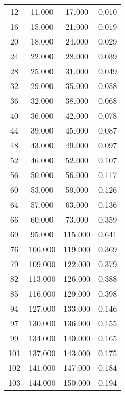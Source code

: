 % 
\begin{tabular}{cccc}
  \hline
  \hline
12 & 11.000 & 17.000 & 0.010 \\ 
  16 & 15.000 & 21.000 & 0.019 \\ 
  20 & 18.000 & 24.000 & 0.029 \\ 
  24 & 22.000 & 28.000 & 0.039 \\ 
  28 & 25.000 & 31.000 & 0.049 \\ 
  32 & 29.000 & 35.000 & 0.058 \\ 
  36 & 32.000 & 38.000 & 0.068 \\ 
  40 & 36.000 & 42.000 & 0.078 \\ 
  44 & 39.000 & 45.000 & 0.087 \\ 
  48 & 43.000 & 49.000 & 0.097 \\ 
  52 & 46.000 & 52.000 & 0.107 \\ 
  56 & 50.000 & 56.000 & 0.117 \\ 
  60 & 53.000 & 59.000 & 0.126 \\ 
  64 & 57.000 & 63.000 & 0.136 \\ 
  66 & 60.000 & 73.000 & 0.359 \\ 
  69 & 95.000 & 115.000 & 0.641 \\ 
  76 & 106.000 & 119.000 & 0.369 \\ 
  79 & 109.000 & 122.000 & 0.379 \\ 
  82 & 113.000 & 126.000 & 0.388 \\ 
  85 & 116.000 & 129.000 & 0.398 \\ 
  94 & 127.000 & 133.000 & 0.146 \\ 
  97 & 130.000 & 136.000 & 0.155 \\ 
  99 & 134.000 & 140.000 & 0.165 \\ 
  101 & 137.000 & 143.000 & 0.175 \\ 
  102 & 141.000 & 147.000 & 0.184 \\ 
  103 & 144.000 & 150.000 & 0.194 \\ 
   \hline
\end{tabular}
